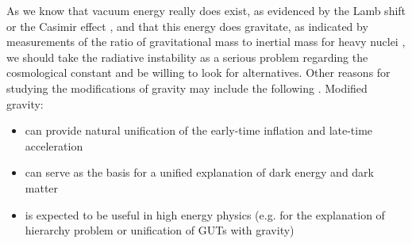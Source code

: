 As we know that vacuum energy really does exist, as evidenced by the Lamb shift \parencite{2020Physi...2..105M} or the Casimir effect \parencite{2006BrJPh..36.1137F}, and that this energy does gravitate, as indicated by measurements of the ratio of gravitational mass to inertial mass for heavy nuclei \parencite{Braginskii:1971tn}, we should take the radiative instability as a serious problem regarding the cosmological constant and be willing to look for alternatives. Other reasons for studying the modifications of gravity may include the following \parencite{2006hep.th....1213N}. Modified gravity:
\begin{itemize}
	\item can provide natural unification of the early-time inflation and late-time acceleration
	\item can serve as the basis for a unified explanation of dark energy and dark matter
	\item is expected to be useful in high energy physics (e.g. for the explanation of hierarchy problem or unification of GUTs with gravity)
\end{itemize}